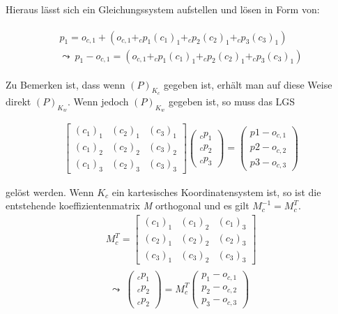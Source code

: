 Hieraus lässt sich ein Gleichungssystem aufstellen und lösen in Form von:
	
	\begin{gather}
	\begin{split}
	p_1 = o_{c,1} + (o_{c,1} + _cp_1(c_1)_1 + _cp_2(c_2)_1 + _cp_3(c_3)_1) \\
	\leadsto \: p_1 - o_{c,1} =  (o_{c,1} + _cp_1(c_1)_1 + _cp_2(c_2)_1 + _cp_3(c_3)_1)
	\end{split}
	\end{gather}
	
Zu Bemerken ist, dass wenn \ensuremath{(P)_{K_c}} gegeben ist, erhält man auf diese Weise direkt \ensuremath{(P)_{K_w}}. Wenn jedoch \ensuremath{(P)_{K_w}} gegeben ist, so muss das LGS
	
	\begin{gather}
	\begin{bmatrix}(c_1)_1 & (c_2)_1 & (c_3)_1\\
	(c_1)_2 & (c_2)_2 & (c_3)_2\\
	(c_1)_3 & (c_2)_3 & (c_3)_3
	\end{bmatrix} 
	\begin{pmatrix}
	_cp_1\\ _cp_2 \\ _cp_3
	\end{pmatrix} = 
	\begin{pmatrix}
	p1- o_{c,1}\\
	p2- o_{c,2}\\
	p3- o_{c,3}
	\end{pmatrix}
	\end{gather}
	
	gelöst werden. Wenn \ensuremath{K_c} ein kartesisches Koordinatensystem ist, so ist die entstehende  koeffizientenmatrix \textit{M} orthogonal und es gilt \ensuremath{M_c^{-1} = M_c^T}. 
	\begin{gather}
	M_c^{T} = 
	\begin{bmatrix}(c_1)_1 & (c_1)_2 & (c_1)_3\\
	(c_2)_1 & (c_2)_2 & (c_2)_3\\
	(c_3)_1 & (c_3)_2 & (c_3)_3
	\end{bmatrix} \\
	\begin{split}
	\leadsto \: \begin{pmatrix}
	_cp_1\\
	_cp_2\\
	_cp_2 
	\end{pmatrix}
	= M_c^T 
	\begin{pmatrix}
	p_1 - o_{c,1}\\
	p_2 - o_{c,2}\\
	p_3 - o_{c,3}
	\end{pmatrix}
	\end{split} 
	\end{gather}
	
